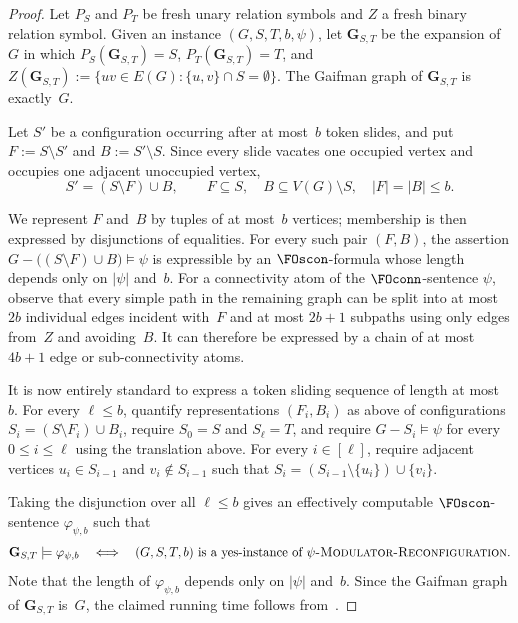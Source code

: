 \documentclass[1p,number,11pt]{elsarticle}
\theoremstyle{plain}
\renewcommand{\leq}{\leqslant}
\begin{document}
\begin{proof}
Let $P_S$ and $P_T$ be fresh unary relation symbols and $Z$ a fresh binary
relation symbol. Given an instance $(G,S,T,b,\psi)$, let
$\mathbf G_{S,T}$ be the expansion of~$G$ in which
$P_S(\mathbf G_{S,T})=S$, $P_T(\mathbf G_{S,T})=T$, 
and $Z(\mathbf G_{S,T})
    :=
    \{uv\in E(G):\{u,v\}\cap S=\emptyset\}$.
The Gaifman graph of $\mathbf G_{S,T}$ is exactly~$G$.

Let $S'$ be a configuration occurring after at most~$b$ token slides, and
put
$F:=S\setminus S'$ and $B:=S'\setminus S$.
Since every slide vacates one occupied vertex and occupies one adjacent
unoccupied vertex,
\[
    S'=(S\setminus F)\cup B,
    \qquad
    F\subseteq S,\quad B\subseteq V(G)\setminus S,
    \quad |F|=|B|\leq b.
\]

We represent $F$ and~$B$ by tuples of at most~$b$ vertices; membership is
then expressed by disjunctions of equalities.
For every such pair $(F,B)$, the assertion $G-\bigl((S\setminus F)\cup B\bigr)\models\psi$
is expressible by an $\FOscon$-formula whose length depends only on
$|\psi|$ and~$b$. For a connectivity atom of the $\FOconn$-sentence $\psi$, observe that every
simple path in the remaining graph can be split into at most $2b$ individual
edges incident with~$F$ and at most $2b+1$ subpaths using only edges from~$Z$
and avoiding~$B$. It can therefore be expressed by a chain of at most
$4b+1$ edge or sub-connectivity atoms.

It is now entirely standard to express a token sliding sequence of length at
most~$b$. For every $\ell\leq b$, quantify representations $(F_i,B_i)$ as
above of configurations $S_i=(S\setminus F_i)\cup B_i$, require
$S_0=S$ and $S_\ell=T$, and require $G-S_i\models\psi$ for every
$0\leq i\leq\ell$ using the translation above.
For every $i\in[\ell]$, require adjacent vertices
$u_i\in S_{i-1}$ and $v_i\notin S_{i-1}$ such that
$S_i=(S_{i-1}\setminus\{u_i\})\cup\{v_i\}$.

Taking the disjunction over all $\ell\leq b$ gives an effectively computable $\FOscon$-sentence $\varphi_{\psi,b}$ such that
\[
    \mathbf G_{S,T}\models\varphi_{\psi,b}
    \quad\Longleftrightarrow\quad
    (G,S,T,b)
    \text{ is a yes-instance of }
    \textsc{$\psi$-Modulator-Reconfiguration}.
\]
Note that the length of $\varphi_{\psi,b}$ depends only on $|\psi|$ and~$b$.
Since the Gaifman graph of $\mathbf G_{S,T}$ is~$G$, the claimed running time
follows from~.
\end{proof}
\end{document}

